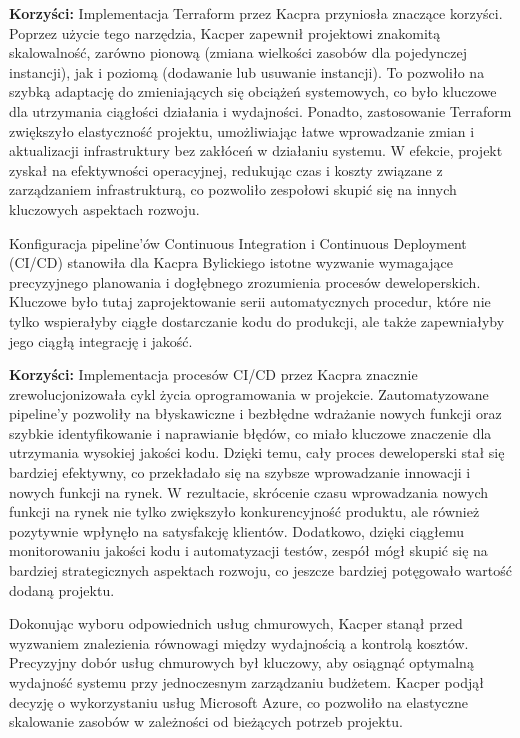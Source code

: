 \documentclass[12pt, a4paper, twoside, openany]{book}
\begin{document}
{\textbf{Korzyści:} Implementacja Terraform przez Kacpra przyniosła znaczące korzyści. Poprzez użycie tego narzędzia, Kacper zapewnił projektowi znakomitą skalowalność, zarówno pionową (zmiana wielkości zasobów dla pojedynczej instancji), jak i poziomą (dodawanie lub usuwanie instancji). To pozwoliło na szybką adaptację do zmieniających się obciążeń systemowych, co było kluczowe dla utrzymania ciągłości działania i wydajności. Ponadto, zastosowanie Terraform zwiększyło elastyczność projektu, umożliwiając łatwe wprowadzanie zmian i aktualizacji infrastruktury bez zakłóceń w działaniu systemu. W efekcie, projekt zyskał na efektywności operacyjnej, redukując czas i koszty związane z zarządzaniem infrastrukturą, co pozwoliło zespołowi skupić się na innych kluczowych aspektach rozwoju.

Konfiguracja pipeline'ów Continuous Integration i Continuous Deployment (CI/CD) stanowiła dla Kacpra Bylickiego istotne wyzwanie wymagające precyzyjnego planowania i dogłębnego zrozumienia procesów deweloperskich. Kluczowe było tutaj zaprojektowanie serii automatycznych procedur, które nie tylko wspierałyby ciągłe dostarczanie kodu do produkcji, ale także zapewniałyby jego ciągłą integrację i jakość.

\textbf{Korzyści:} Implementacja procesów CI/CD przez Kacpra znacznie zrewolucjonizowała cykl życia oprogramowania w projekcie. Zautomatyzowane pipeline'y pozwoliły na błyskawiczne i bezbłędne wdrażanie nowych funkcji oraz szybkie identyfikowanie i naprawianie błędów, co miało kluczowe znaczenie dla utrzymania wysokiej jakości kodu. Dzięki temu, cały proces deweloperski stał się bardziej efektywny, co przekładało się na szybsze wprowadzanie innowacji i nowych funkcji na rynek. W rezultacie, skrócenie czasu wprowadzania nowych funkcji na rynek nie tylko zwiększyło konkurencyjność produktu, ale również pozytywnie wpłynęło na satysfakcję klientów. Dodatkowo, dzięki ciągłemu monitorowaniu jakości kodu i automatyzacji testów, zespół mógł skupić się na bardziej strategicznych aspektach rozwoju, co jeszcze bardziej potęgowało wartość dodaną projektu.

Dokonując wyboru odpowiednich usług chmurowych, Kacper stanął przed wyzwaniem znalezienia równowagi między wydajnością a kontrolą kosztów. Precyzyjny dobór usług chmurowych był kluczowy, aby osiągnąć optymalną wydajność systemu przy jednoczesnym zarządzaniu budżetem. Kacper podjął decyzję o wykorzystaniu usług Microsoft Azure, co pozwoliło na elastyczne skalowanie zasobów w zależności od bieżących potrzeb projektu.

}
\end{document}
